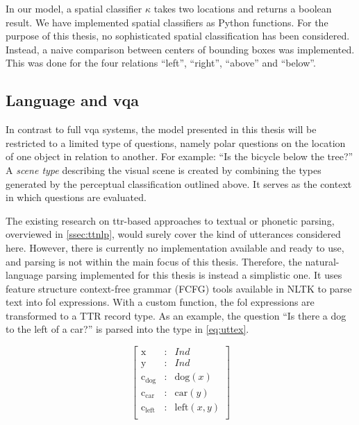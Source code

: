 In our model, a spatial classifier $\kappa$ takes two locations and returns a boolean result.
We have implemented spatial classifiers as Python functions.
For the purpose of this thesis, no sophisticated spatial classification has been considered.
Instead, a naive comparison between centers of bounding boxes was implemented.
This was done for the four relations ``left'', ``right'', ``above'' and ``below''.



\subsection{Language and \acrshort{vqa}}
\label{ssec:languagevqa}

In contrast to full \gls{vqa} systems, the model presented in this thesis will be restricted to a limited type of questions, namely polar questions on the location of one object in relation to another.
For example: ``Is the bicycle below the tree?''
A \textit{scene type} describing the visual scene is created by combining the types generated by the perceptual classification outlined above.
It serves as the context in which questions are evaluated.

The existing research on \gls{ttr}-based approaches to textual or phonetic parsing, overviewed in \autoref{ssec:ttnlp}, would surely cover the kind of utterances considered here.
However, there is currently no implementation available and ready to use, and parsing is not within the main focus of this thesis.
Therefore, the natural-language parsing implemented for this thesis is instead a simplistic one.
It uses feature structure context-free grammar (FCFG) tools available in NLTK \citep{BirdNaturalLanguageProcessing2009} to parse text into \gls{fol} expressions.
With a custom function, the \gls{fol} expressions are transformed to a TTR record type.
As an example, the question ``Is there a dog to the left of a car?'' is parsed into the type in \autoref{eq:uttex}.

\begin{equation}\label{eq:uttex}
\left[\begin{array}{rcl}
\text{x} &:& Ind\\
\text{y} &:& Ind\\
\text{c}_\text{dog} &:& \text{dog}(x)\\
\text{c}_\text{car} &:& \text{car}(y)\\
\text{c}_\text{left} &:& \text{left}(x, y)\\
\end{array}\right]\end{equation}

